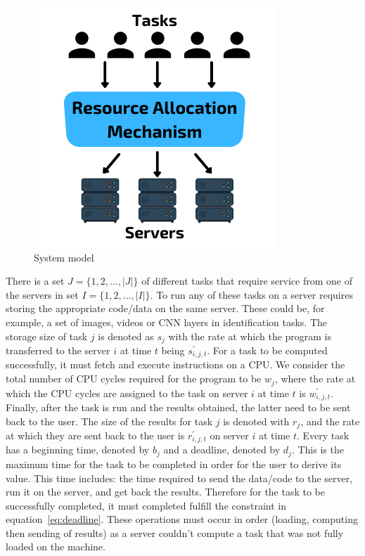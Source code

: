 \begin{figure}
    \centering
    \includegraphics{figures/system_model.pdf}
    \caption{System model}
    \label{fig:system_model}
\end{figure}

There is a set $J = \{1,2,\ldots,\left| J \right|\}$ of  different tasks that require service from one of the servers
in set $I = \{1,2,\ldots, \left| I \right|\}$. To run any of these tasks on a server requires storing the appropriate
code/data on the same server. These could be, for example, a set of images, videos or CNN layers in identification
tasks. The storage size of task $j$ is denoted as $s_j$ with the rate at which the program is transferred to the server
$i$ at time $t$ being $s^{'}_{i,j,t}$. For a task to be computed successfully, it must fetch and execute instructions
on a CPU. We consider the total number of CPU cycles required for the program to be $w_j$, where the rate at which the
CPU cycles are assigned to the task on server $i$ at time $t$ is $w^{'}_{i,j,t}$. Finally, after the task is run and
the results obtained, the latter need to be sent back to the user. The size of the results for task $j$ is denoted with
$r_j$, and the rate at which they are sent back to the user is $r^{'}_{i,j,t}$ on server $i$ at time $t$. Every task
has a beginning time, denoted by $b_j$ and a deadline, denoted by $d_j$. This is the maximum time for the task to be
completed in order for the user to derive its value. This time includes: the time required to send the data/code to the
server, run it on the server, and get back the results. Therefore for the task to be successfully completed, it must
completed fulfill the constraint in equation~\eqref{eq:deadline}. These operations must occur in order (loading,
computing then sending of results) as a server couldn't compute a task that was not fully loaded on the machine.

